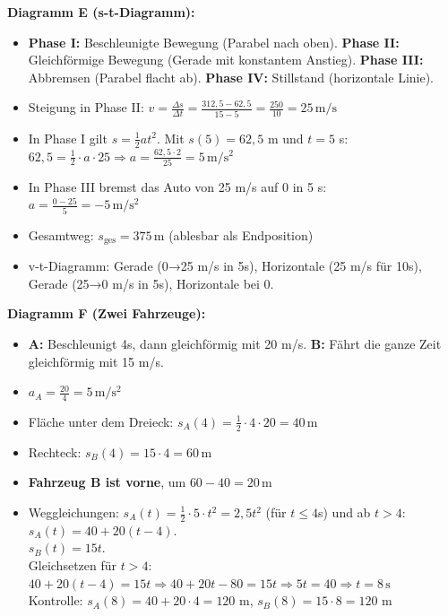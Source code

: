 \documentclass[11pt,a4paper]{article}
\begin{document}
\vspace{0.3cm}
\textbf{Diagramm E (s-t-Diagramm):}
\begin{itemize}
\item[a)] \textbf{Phase I:} Beschleunigte Bewegung (Parabel nach oben). \textbf{Phase II:} Gleichförmige Bewegung (Gerade mit konstantem Anstieg). \textbf{Phase III:} Abbremsen (Parabel flacht ab). \textbf{Phase IV:} Stillstand (horizontale Linie).
\item[b)] Steigung in Phase II: $v = \frac{\Delta s}{\Delta t} = \frac{312{,}5 - 62{,}5}{15-5} = \frac{250}{10} = \boxed{25\,\mathrm{m/s}}$
\item[c)] In Phase I gilt $s = \frac{1}{2}at^2$. Mit $s(5) = 62{,}5$ m und $t = 5$ s:\\
$62{,}5 = \frac{1}{2} \cdot a \cdot 25 \Rightarrow a = \frac{62{,}5 \cdot 2}{25} = \boxed{5\,\mathrm{m/s^2}}$
\item[d)] In Phase III bremst das Auto von 25 m/s auf 0 in 5 s:\\
$a = \frac{0 - 25}{5} = \boxed{-5\,\mathrm{m/s^2}}$
\item[e)] Gesamtweg: $s_{\text{ges}} = \boxed{375\,\mathrm{m}}$ (ablesbar als Endposition)
\item[f)] v-t-Diagramm: Gerade (0→25 m/s in 5s), Horizontale (25 m/s für 10s), Gerade (25→0 m/s in 5s), Horizontale bei 0.
\end{itemize}

\vspace{0.3cm}
\textbf{Diagramm F (Zwei Fahrzeuge):}
\begin{itemize}
\item[a)] \textbf{A:} Beschleunigt 4s, dann gleichförmig mit 20 m/s. \textbf{B:} Fährt die ganze Zeit gleichförmig mit 15 m/s.
\item[b)] $a_A = \frac{20}{4} = \boxed{5\,\mathrm{m/s^2}}$
\item[c)] Fläche unter dem Dreieck: $s_A(4) = \frac{1}{2} \cdot 4 \cdot 20 = \boxed{40\,\mathrm{m}}$
\item[d)] Rechteck: $s_B(4) = 15 \cdot 4 = \boxed{60\,\mathrm{m}}$
\item[e)] \textbf{Fahrzeug B ist vorne}, um $60 - 40 = \boxed{20\,\mathrm{m}}$
\item[f)] Weggleichungen: $s_A(t) = \frac{1}{2} \cdot 5 \cdot t^2 = 2{,}5t^2$ (für $t \leq 4$s) und ab $t > 4$: $s_A(t) = 40 + 20(t-4)$.\\
$s_B(t) = 15t$.\\
Gleichsetzen für $t > 4$: $40 + 20(t-4) = 15t \Rightarrow 40 + 20t - 80 = 15t \Rightarrow 5t = 40 \Rightarrow \boxed{t = 8\,\mathrm{s}}$\\
Kontrolle: $s_A(8) = 40 + 20 \cdot 4 = 120$ m, $s_B(8) = 15 \cdot 8 = 120$ m \checkmark
\end{itemize}
\end{document}
